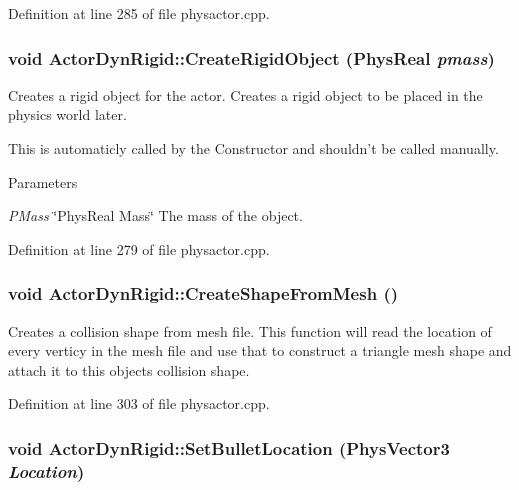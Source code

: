 Definition at line 285 of file physactor.cpp.\hypertarget{classActorDynRigid_a93052967ae8e6bebb810a5303ebc2a48}{
\subsubsection[{CreateRigidObject}]{\setlength{\rightskip}{0pt plus 5cm}void ActorDynRigid::CreateRigidObject (PhysReal {\em pmass})}}
\label{d4/d0e/classActorDynRigid_a93052967ae8e6bebb810a5303ebc2a48}


Creates a rigid object for the actor. Creates a rigid object to be placed in the physics world later. \par
 This is automaticly called by the Constructor and shouldn't be called manually. 
\begin{DoxyParams}{Parameters}
\item[{\em PMass}]\char`\"{}PhysReal Mass\char`\"{} The mass of the object. \end{DoxyParams}


Definition at line 279 of file physactor.cpp.\hypertarget{classActorDynRigid_adbfe8a19f8aafe7928d9896c37821059}{
\subsubsection[{CreateShapeFromMesh}]{\setlength{\rightskip}{0pt plus 5cm}void ActorDynRigid::CreateShapeFromMesh ()}}
\label{d4/d0e/classActorDynRigid_adbfe8a19f8aafe7928d9896c37821059}


Creates a collision shape from mesh file. This function will read the location of every verticy in the mesh file and use that to construct a triangle mesh shape and attach it to this objects collision shape. 

Definition at line 303 of file physactor.cpp.\hypertarget{classActorDynRigid_a3f0720ca18d04a1084207d474c3d7834}{
\subsubsection[{SetBulletLocation}]{\setlength{\rightskip}{0pt plus 5cm}void ActorDynRigid::SetBulletLocation ({\bf PhysVector3} {\em Location})}}
\label{d4/d0e/classActorDynRigid_a3f0720ca18d04a1084207d474c3d7834}



